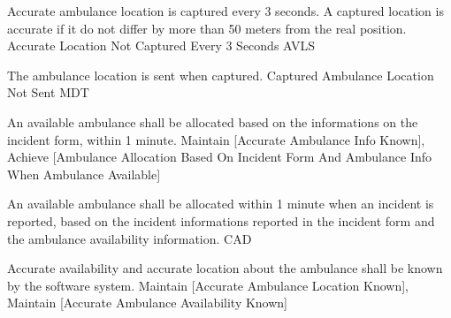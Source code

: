   \startkaosspec
  	 {Accurate ambulance location is captured every 3 seconds. A captured location is accurate if it do not differ by more than 50 meters from the real position.}
  	 {Accurate Location Not Captured Every 3 Seconds}
  	 {AVLS}
  \stopkaosspec

  \startkaosspec
  	 {The ambulance location is sent when captured.}
  	 {Captured Ambulance Location Not Sent}
  	 {MDT}
  \stopkaosspec
  
  
    {}

  \startkaosspec
  	 {An available ambulance shall be allocated based on the informations on the incident form, within 1 minute.}
  	 {Maintain [Accurate Ambulance Info Known], Achieve [Ambulance Allocation Based On Incident Form And Ambulance Info When Ambulance Available]}
  \stopkaosspec

  \startkaosspec
  	 {An available ambulance shall be allocated within 1 minute when an incident is reported, based on the incident informations reported in the incident form and the ambulance availability information.}
  	 {CAD}
  \stopkaosspec

  \startkaosspec
  	 {Accurate availability and accurate location about the ambulance shall be known by the software system.}
  	 {Maintain [Accurate Ambulance Location Known], Maintain [Accurate Ambulance Availability Known]}
  \stopkaosspec

  
    {}

